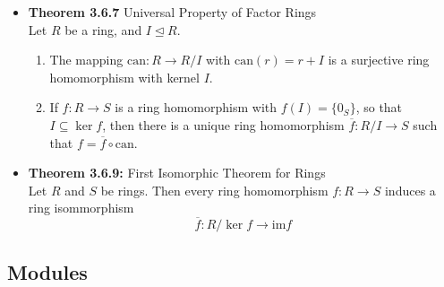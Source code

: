 \documentclass[11pt,a4paper]{article}
\begin{document}
\begin{itemize}
    \item \textbf{Theorem 3.6.7} Universal Property of Factor Rings \\
        Let $R$ be a ring, and $I \trianglelefteq R$.
        \begin{enumerate}
            \item The mapping $\mathrm{can}: R \to R / I$ with $\mathrm{can}(r) = r + I$
                is a surjective ring homomorphism with kernel $I$.
            \item If $f : R \to S$ is a ring homomorphism with $f(I) = \{0_S\}$,
                so that $I \subseteq \ker f$, then there is a unique ring homomorphism
                $\overline{f}: R / I \to S$ such that $f = \overline{f} \circ \mathrm{can}$.
        \end{enumerate}

    \item \textbf{Theorem 3.6.9:} First Isomorphic Theorem for Rings \\
        Let $R$ and $S$ be rings.
        Then every ring homomorphism $f : R \to S$ induces a ring isommorphism
        \[
            \overline{f} : R / \ker f \to \mathrm{im} f
        \]
\end{itemize}

\subsection{Modules}
\end{document}
